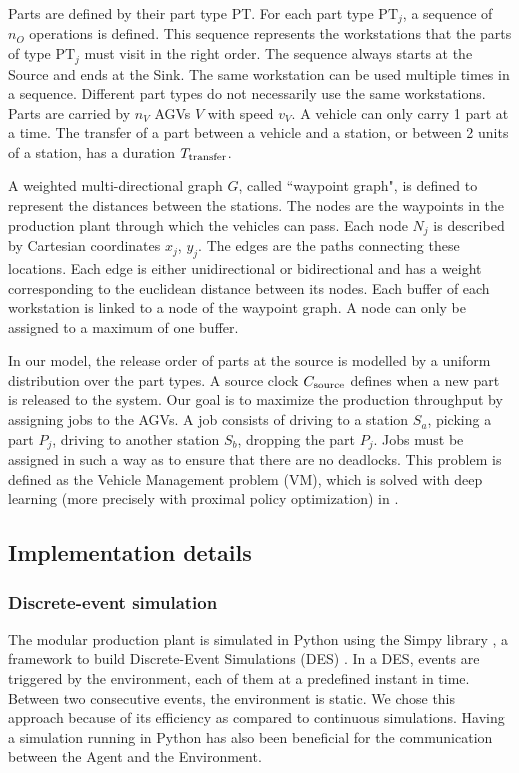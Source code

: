 \documentclass[sn-mathphys]{sn-jnl}
\begin{document}
Parts are defined by their part type PT. For each part type $\text{PT}_j$, a sequence of $n_{O}$ operations is defined. This sequence represents the workstations that the parts of type $\text{PT}_j$ must visit in the right order. The sequence always starts at the Source and ends at the Sink. The same workstation can be used multiple times in a sequence. Different part types do not necessarily use the same workstations. Parts are carried by $n_V$ AGVs $V$ with speed $v_V$. A vehicle can only carry 1 part at a time. The transfer of a part between a vehicle and a station, or between 2 units of a station, has a duration $T_{\rm transfer}$.

A weighted multi-directional graph $G$, called “waypoint graph", is defined to represent the distances between the stations. The nodes are the waypoints in the production plant through which the vehicles can pass. Each node $N_{j}$ is described by Cartesian coordinates {$x_{j}$, $y_{j}$}. The edges are the paths connecting these locations. Each edge is either unidirectional or bidirectional and has a weight corresponding to the euclidean distance between its nodes. Each buffer of each workstation is linked to a node of the waypoint graph. A node can only be assigned to a maximum of one buffer.

In our model, the release order of parts at the source is modelled by a uniform distribution over the part types. A source clock $C_{\rm source}$ defines when a new part is released to the system. Our goal is to maximize the production throughput by assigning jobs to the AGVs. A job consists of driving to a station $S_a$, picking a part $P_j$, driving to another station $S_b$, dropping the part $P_j$. Jobs must be assigned in such a way as to ensure that there are no deadlocks. This problem is defined as the Vehicle Management problem (VM), which is solved with deep learning (more precisely with proximal policy optimization) in \cite{Mayer2021}.

\subsection{Implementation details}

\subsubsection{Discrete-event simulation}

The modular production plant is simulated in Python using the Simpy library \cite{matloff2008introduction}, a framework to build Discrete-Event Simulations (DES) \cite{osti_6893405}. In a DES, events are triggered by the environment, each of them at a predefined instant in time. Between two consecutive events, the environment is static. We chose this approach because of its efficiency as compared to continuous simulations. Having a simulation running in Python has also been beneficial for the communication between the Agent and the Environment.
\end{document}
